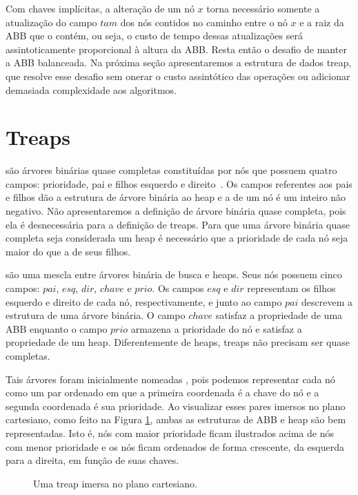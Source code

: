 Com chaves implícitas, a alteração de um nó $x$ torna necessário somente a atualização do campo $tam$ dos nós contidos no caminho entre o nó $x$ e a raiz da ABB que o contém, ou seja, o custo de tempo dessas atualizações será assintoticamente proporcional à altura da ABB. Resta então o desafio de manter a ABB balanceada. Na próxima seção apresentaremos a estrutura de dados treap, que resolve esse desafio sem onerar o custo assintótico das operações ou adicionar demasiada complexidade aos algoritmos.

\section{Treaps}

 são árvores binárias quase completas constituídas por nós que possuem quatro campos: prioridade, pai e filhos esquerdo e direito~\cite{CLRS}. Os campos referentes aos pais e filhos dão a estrutura de árvore binária ao heap e a  de um nó é um inteiro não negativo. Não apresentaremos a definição de árvore binária quase completa, pois ela é desnecessária para a definição de treaps. Para que uma árvore binária quase completa seja considerada um heap é necessário que a prioridade de cada nó seja maior do que a de seus filhos.

 são uma mescla entre árvores binária de busca e heaps. Seus nós possuem cinco campos: $pai$, $esq$, $dir$, $chave$ e $prio$. Os campos $esq$ e $dir$ representam os filhos esquerdo e direito de cada nó, respectivamente, e junto ao campo $pai$ descrevem a estrutura de uma árvore binária. O campo $chave$ satisfaz a propriedade de uma ABB enquanto o campo $prio$ armazena a prioridade do nó e satisfaz a propriedade de um heap. Diferentemente de heaps, treaps não precisam ser quase completas.


Tais árvores foram inicialmente nomeadas  \cite{Vuillemin1980AUL}, pois podemos representar cada nó como um par ordenado em que a primeira coordenada é a chave do nó e a segunda coordenada é sua prioridade. Ao visualizar esses pares imersos no plano cartesiano, como feito na Figura \ref{fig:TREAP}, ambas as estruturas de ABB e heap são bem representadas. Isto é, nós com maior prioridade ficam ilustrados acima de nós com menor prioridade e os nós ficam ordenados de forma crescente, da esquerda para a direita, em função de suas chaves.

\begin{figure}[htb]
\centering

\caption{Uma treap imersa no plano cartesiano.}
\label{fig:TREAP}
\end{figure}

